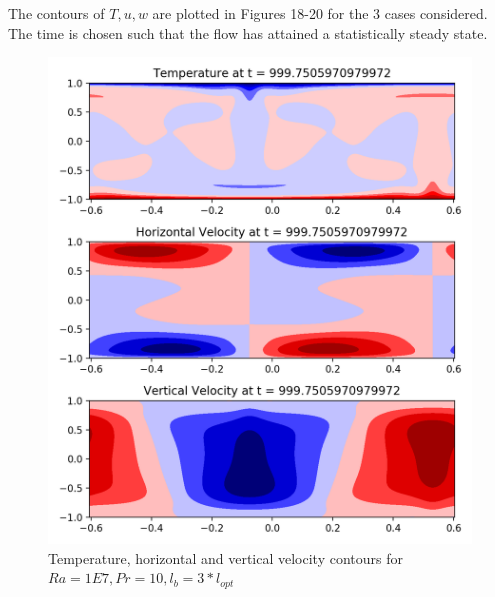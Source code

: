 \documentclass[12pt]{article}
\begin{document}
     The contours of $T,u,w$ are plotted in Figures 18-20 for the 3 cases considered. The time is chosen such that the flow has attained a statistically steady state.
     
     \begin{figure}[!htb]
     	\includegraphics[width=\linewidth]{contours_1E7_10_3.png}
     	\caption{Temperature, horizontal and vertical velocity contours for $Ra = 1E7, Pr =10, l_b = 3* l_{opt} $ }
     	\label{fig:fig18}
     \end{figure}
     
     \clearpage
     
\end{document}
